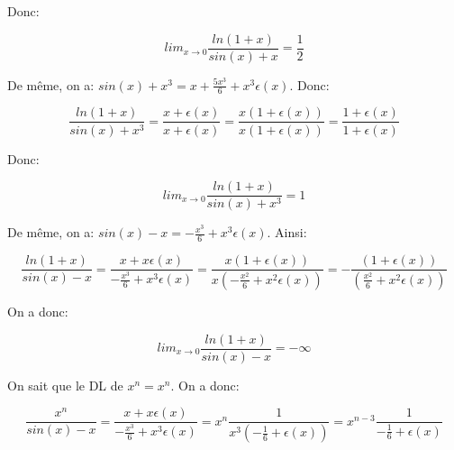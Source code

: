 \documentclass[12pt,a4paper, french]{article}
\begin{document}
Donc: 
\begin{center}
    \begin{equation*}
    lim_{x \to 0}\frac{ln(1+x)}{sin(x)+x}=\frac{1}{2}
    \end{equation*}
\end{center}

De même, on a: \begin{math}
    sin(x)+x^3=x+\frac{5x^3}{6}+x^3\epsilon(x)
\end{math}. Donc:
\begin{center}
    \begin{equation*}
    \frac{ln(1+x)}{sin(x)+x^3}=\frac{x+\epsilon(x)}{x+\epsilon(x)}=\frac{x(1+\epsilon(x))}{x(1+\epsilon(x))}=\frac{1+\epsilon(x)}{1+\epsilon(x)}
    \end{equation*}
\end{center}
\newpage
Donc:
\begin{center}
    \begin{equation*}
    lim_{x \to 0}\frac{ln(1+x)}{sin(x)+x^3}=1
    \end{equation*}
\end{center}

De même, on a: \begin{math}
    sin(x)-x=-\frac{x^3}{6}+x^3\epsilon(x)
\end{math}. Ainsi:
\begin{center}
    \begin{equation*}
       \frac{ln(1+x)}{sin(x)-x}=\frac{x+x\epsilon(x)}{-\frac{x^3}{6}+x^3\epsilon(x)}=\frac{x(1+\epsilon(x))}{x(-\frac{x^2}{6}+x^2\epsilon(x))}=-\frac{(1+\epsilon(x))}{(\frac{x^2}{6}+x^2\epsilon(x))}
    \end{equation*}
\end{center}

On a donc:
\begin{center}
    \begin{equation*}
       lim_{x \to 0}\frac{ln(1+x)}{sin(x)-x}=-\infty
    \end{equation*}
\end{center}

On sait que le DL de \begin{math}
    x^n=x^n
\end{math}. On a donc:
\begin{center}
    \begin{equation*}
    \frac{x^n}{sin(x)-x}=\frac{x+x\epsilon(x)}{-\frac{x^3}{6}+x^3\epsilon(x)}=x^n\frac{1}{x^3(-\frac{1}{6}+\epsilon(x))}=x^{n-3}\frac{1}{-\frac{1}{6}+\epsilon(x)}
    \end{equation*}
\end{center}
\end{document}
